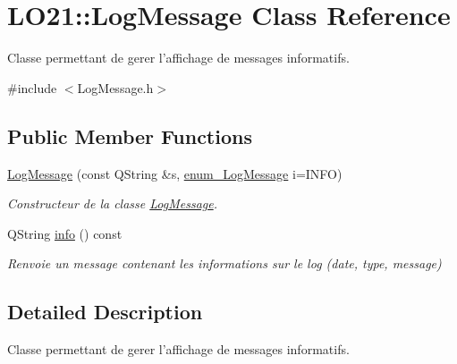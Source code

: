 \hypertarget{class_l_o21_1_1_log_message}{\section{\-L\-O21\-:\-:\-Log\-Message \-Class \-Reference}
\label{class_l_o21_1_1_log_message}
}


\-Classe permettant de gerer l'affichage de messages informatifs.  




{\ttfamily \#include $<$\-Log\-Message.\-h$>$}

\subsection*{\-Public \-Member \-Functions}
\begin{DoxyCompactItemize}
\item 
\hyperlink{class_l_o21_1_1_log_message_a1ad22414291bccb702051bd0b1c8ff2a}{\-Log\-Message} (const \-Q\-String \&s, \hyperlink{namespace_l_o21_a129f8d204fc6d0d79283a2cf32d833df}{enum\-\_\-\-Log\-Message} i=\-I\-N\-F\-O)
\begin{DoxyCompactList}\small\item\em \-Constructeur de la classe \hyperlink{class_l_o21_1_1_log_message}{\-Log\-Message}. \end{DoxyCompactList}\item 
\-Q\-String \hyperlink{class_l_o21_1_1_log_message_a7f434101ea4728eaee6ce6c0dc6f28a7}{info} () const 
\begin{DoxyCompactList}\small\item\em \-Renvoie un message contenant les informations sur le log (date, type, message) \end{DoxyCompactList}\end{DoxyCompactItemize}


\subsection{\-Detailed \-Description}
\-Classe permettant de gerer l'affichage de messages informatifs. 

